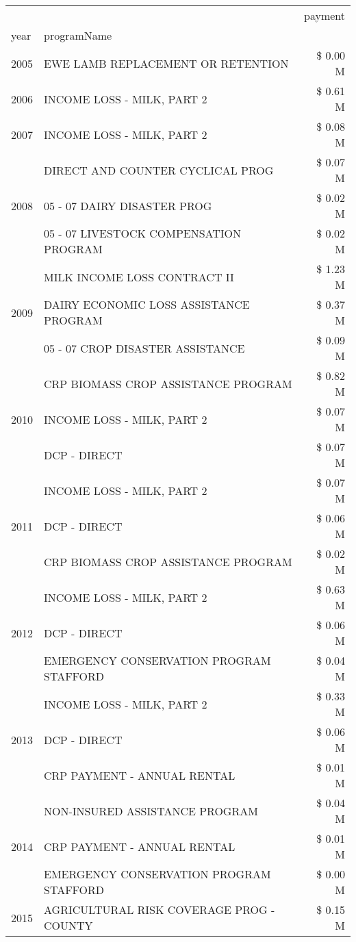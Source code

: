 \begin{tabular}{llr}
\toprule
 &  & payment \\
year & programName &  \\
\midrule
2005 & EWE LAMB REPLACEMENT OR RETENTION & \$ 0.00 M \\
\cline{1-3}
2006 & INCOME LOSS - MILK, PART 2 & \$ 0.61 M \\
\cline{1-3}
2007 & INCOME LOSS - MILK, PART 2 & \$ 0.08 M \\
\cline{1-3}
\multirow[t]{3}{*}{2008} & DIRECT AND COUNTER CYCLICAL PROG & \$ 0.07 M \\
 & 05 - 07 DAIRY DISASTER PROG & \$ 0.02 M \\
 & 05 - 07 LIVESTOCK COMPENSATION PROGRAM & \$ 0.02 M \\
\cline{1-3}
\multirow[t]{3}{*}{2009} & MILK INCOME LOSS CONTRACT II & \$ 1.23 M \\
 & DAIRY ECONOMIC LOSS ASSISTANCE PROGRAM & \$ 0.37 M \\
 & 05 - 07 CROP DISASTER ASSISTANCE & \$ 0.09 M \\
\cline{1-3}
\multirow[t]{3}{*}{2010} & CRP BIOMASS CROP ASSISTANCE PROGRAM & \$ 0.82 M \\
 & INCOME LOSS - MILK, PART 2 & \$ 0.07 M \\
 & DCP - DIRECT & \$ 0.07 M \\
\cline{1-3}
\multirow[t]{3}{*}{2011} & INCOME LOSS - MILK, PART 2 & \$ 0.07 M \\
 & DCP - DIRECT & \$ 0.06 M \\
 & CRP BIOMASS CROP ASSISTANCE PROGRAM & \$ 0.02 M \\
\cline{1-3}
\multirow[t]{3}{*}{2012} & INCOME LOSS - MILK, PART 2 & \$ 0.63 M \\
 & DCP - DIRECT & \$ 0.06 M \\
 & EMERGENCY CONSERVATION PROGRAM STAFFORD & \$ 0.04 M \\
\cline{1-3}
\multirow[t]{3}{*}{2013} & INCOME LOSS - MILK, PART 2 & \$ 0.33 M \\
 & DCP - DIRECT & \$ 0.06 M \\
 & CRP PAYMENT - ANNUAL RENTAL & \$ 0.01 M \\
\cline{1-3}
\multirow[t]{3}{*}{2014} & NON-INSURED ASSISTANCE PROGRAM & \$ 0.04 M \\
 & CRP PAYMENT - ANNUAL RENTAL & \$ 0.01 M \\
 & EMERGENCY CONSERVATION PROGRAM STAFFORD & \$ 0.00 M \\
\cline{1-3}
\multirow[t]{3}{*}{2015} & AGRICULTURAL RISK COVERAGE PROG - COUNTY & \$ 0.15 M \\

\end{tabular}
